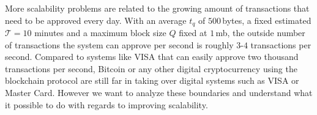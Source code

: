 \documentclass[USenglish]{uit-thesis}
\begin{document}
More scalability problems are related to the growing amount
of transactions that need to be approved every day.
With an average $t_q$ of $500$\,bytes, a fixed estimated
$\mathcal{T}=10$ minutes
and a maximum block size $Q$ fixed at $1$\,\gls{mb}, the outside number
of transactions the system can approve
per second is roughly $3$-$4$ transactions per second.
Compared to systems like VISA that can
easily approve two thousand transactions per second, Bitcoin
or any other digital cryptocurrency using the blockchain
protocol are still far in taking over digital systems such as VISA or
Master Card. However we want to analyze these boundaries and understand
what it possible to do with regards to improving scalability.
\end{document}
